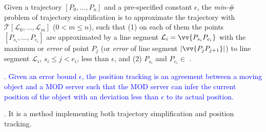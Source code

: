 Given a trajectory $\left[P_0, \dots, P_n\right]$ and a pre-specified constant $\epsilon$, the \emph{min-$\#$} problem of trajectory simplification is to approximate the trajectory  with $\overline{\mathcal{T}}\left[\mathcal{L}_0, \ldots , \mathcal{L}_m\right]$ ($0< m \le n$), such that
(1) on each of them the points $\left[P_{s_i}, \dots, P_{e_i}\right]$ are approximated by a line segment $\mathcal{L}_i = \vv{P_{s_i}P_{e_i}}$ with the maximum \ped or \sed \emph{error} of point $P_j$ (or \dad \emph{error} of line segment $|\vv{P_jP_{j+1}}|$) to line segment $\mathcal{L}_i$, $s_i \le j<e_i$,  less than $\epsilon$, and
(2) $P_{s_i}$ and $P_{e_i} \in$ .


. \textcolor{blue}{Given an error bound $\epsilon$, the position tracking is an agreement between a moving object and a MOD server such that the MOD server can infer the current position of the object with an deviation less than $\epsilon$ to its actual position.}

. It is a method implementing both trajectory simplification and position tracking.



